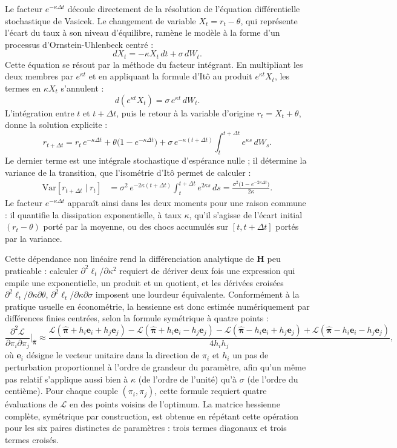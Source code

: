 Le facteur $e^{-\kappa\Delta t}$ découle directement de la résolution de l'équation différentielle stochastique de Vasicek. Le changement de variable $X_t = r_t - \theta$, qui représente l'écart du taux à son niveau d'équilibre, ramène le modèle à la forme d'un processus d'Ornstein-Uhlenbeck centré :
\[
    dX_t = -\kappa X_t\,dt + \sigma\,dW_t.
\]
Cette équation se résout par la méthode du facteur intégrant. En multipliant les deux membres par $e^{\kappa t}$ et en appliquant la formule d'Itô au produit $e^{\kappa t}X_t$, les termes en $\kappa X_t$ s'annulent :
\[
    d(e^{\kappa t}X_t) = \sigma\,e^{\kappa t}\,dW_t.
\]
L'intégration entre $t$ et $t + \Delta t$, puis le retour à la variable d'origine $r_t = X_t + \theta$, donne la solution explicite :
\[
    r_{t+\Delta t} = r_t\,e^{-\kappa\Delta t} + \theta\bigl(1 - e^{-\kappa\Delta t}\bigr) + \sigma\,e^{-\kappa(t+\Delta t)}\int_t^{t+\Delta t} e^{\kappa s}\,dW_s.
\]
Le dernier terme est une intégrale stochastique d'espérance nulle ; il détermine la variance de la transition, que l'isométrie d'Itô permet de calculer :
\begin{align*}
    \mathrm{Var}[r_{t+\Delta t} \mid r_t]
    &= \sigma^2\,e^{-2\kappa(t+\Delta t)}\int_t^{t+\Delta t} e^{2\kappa s}\,ds
    = \frac{\sigma^2\bigl(1 - e^{-2\kappa\Delta t}\bigr)}{2\kappa}.
\end{align*}
Le facteur $e^{-\kappa\Delta t}$ apparaît ainsi dans les deux moments pour une raison commune : il quantifie la dissipation exponentielle, à taux $\kappa$, qu'il s'agisse de l'écart initial $(r_t - \theta)$ porté par la moyenne, ou des chocs accumulés sur $[t, t+\Delta t]$ portés par la variance.

Cette dépendance non linéaire rend la différenciation analytique de $\mathbf{H}$ peu praticable : calculer $\partial^2\ell_t/\partial\kappa^2$ requiert de dériver deux fois une expression qui empile une exponentielle, un produit et un quotient, et les dérivées croisées $\partial^2\ell_t/\partial\kappa\partial\theta$, $\partial^2\ell_t/\partial\kappa\partial\sigma$ imposent une lourdeur équivalente. Conformément à la pratique usuelle en économétrie, la hessienne est donc estimée numériquement par différences finies centrées, selon la formule symétrique à quatre points :
\[
    \frac{\partial^2 \mathcal{L}}{\partial \pi_i \partial \pi_j}\bigg|_{\hat{\boldsymbol{\pi}}} \approx \frac{\mathcal{L}(\hat{\boldsymbol{\pi}} + h_i \mathbf{e}_i + h_j \mathbf{e}_j) - \mathcal{L}(\hat{\boldsymbol{\pi}} + h_i \mathbf{e}_i - h_j \mathbf{e}_j) - \mathcal{L}(\hat{\boldsymbol{\pi}} - h_i \mathbf{e}_i + h_j \mathbf{e}_j) + \mathcal{L}(\hat{\boldsymbol{\pi}} - h_i \mathbf{e}_i - h_j \mathbf{e}_j)}{4 h_i h_j},
\]
où $\mathbf{e}_i$ désigne le vecteur unitaire dans la direction de $\pi_i$ et $h_i$ un pas de perturbation proportionnel à l'ordre de grandeur du paramètre, afin qu'un même pas relatif s'applique aussi bien à $\kappa$ (de l'ordre de l'unité) qu'à $\sigma$ (de l'ordre du centième). Pour chaque couple $(\pi_i, \pi_j)$, cette formule requiert quatre évaluations de $\mathcal{L}$ en des points voisins de l'optimum. La matrice hessienne complète, symétrique par construction, est obtenue en répétant cette opération pour les six paires distinctes de paramètres : trois termes diagonaux et trois termes croisés.

